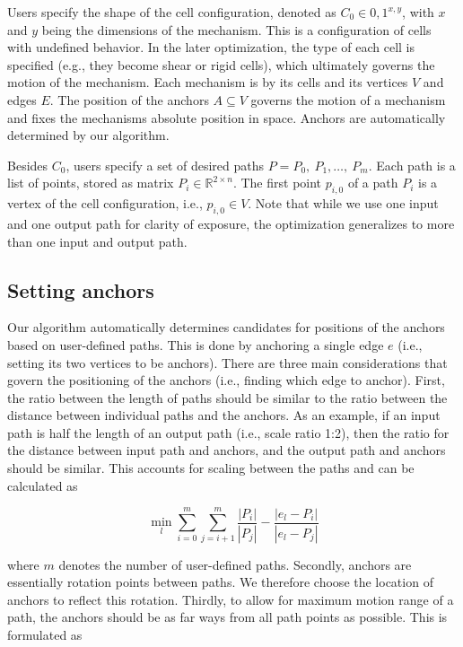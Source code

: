 Users specify the shape of the cell configuration, denoted as $C_0\in{0,1}^{x,y}$, with $x$ and $y$ being the dimensions of the mechanism. This is a configuration of cells with undefined behavior. In the later optimization, the type of each cell is specified (e.g., they become shear or rigid cells), which ultimately governs the motion of the mechanism. Each mechanism is by its cells and its vertices $V$ and edges $E$. The position of the anchors $A\subseteq V$ governs the motion of a mechanism and fixes the mechanisms absolute position in space. Anchors are automatically determined by our algorithm.

Besides $C_0$, users specify a set of desired paths $P={P_0,\ P_1,\ldots,\ P_m}$. Each path is a list of points, stored as matrix $P_i\in\mathbb{R}^{2\times n}$. The first point $p_{i,0}$ of a path $P_i$ is a vertex of the cell configuration, i.e.,  $p_{i,0}\in V$. Note that while we use one input and one output path for clarity of exposure, the optimization generalizes to more than one input and output path.


\subsection{Setting anchors}

Our algorithm automatically determines candidates for positions of the anchors based on user-defined paths. This is done by anchoring a single edge $e$ (i.e., setting its two vertices to be anchors). There are three main considerations that govern the positioning of the anchors (i.e., finding which edge to anchor). First, the ratio between the length of paths should be similar to the ratio between the distance between individual paths and the anchors. As an example, if an input path is half the length of an output path (i.e., scale ratio 1:2), then the ratio for the distance between input path and anchors, and the output path and anchors should be similar. This accounts for scaling between the paths and can be calculated as

$$\min_l
{
\sum_{i=0}^{m}
\sum_{j=i+1}^{m}
{\frac{\left| P_i \right|}{\left| P_j \right|}}
-
{\frac{\left| e_l-P_i \right|}{\left| e_l-P_j \right|}}
}
$$

where $m$ denotes the number of user-defined paths. Secondly, anchors are essentially rotation points between paths. We therefore choose the location of anchors to reflect this rotation. Thirdly, to allow for maximum motion range of a path, the anchors should be as far ways from all path points as possible. This is formulated as 

